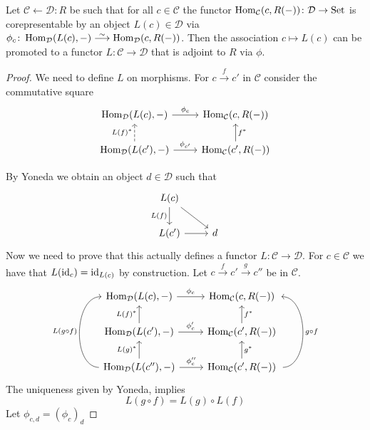 

\begin{prop}
    Let $\mathcal{C} \xleftarrow{}\mathcal{D}:R$ be such that for all $c \in \mathcal{C}$ the functor $\operatorname{Hom}_{\mathcal{C}}(c,R(-))\colon \mathcal{D} \to \operatorname{Set}$ is corepresentable by an object $L(c) \in \mathcal{D}$ via $\phi_c \colon \Hom_{\mathcal{D}}(L(c),-) \isomorphism \Hom_{\mathcal{D}}(c,R(-))$.
    Then the association $c \mapsto L(c)$ can be promoted to a functor $L \colon \mathcal{C} \to \mathcal{D}$ that is adjoint to $R$ via $\phi$.
\end{prop}

\begin{proof}
    We need to define $L$ on morphisms.
    For $c \xrightarrow{f}c'$ in $\mathcal{C}$ consider the commutative square
    \[
    \begin{tikzcd}
        \Hom_{\mathcal{D}}(L(c),-)
        \arrow[r, "\phi_c"]
        &
        \Hom_{\mathcal{C}}(c,R(-))
        \\
        \Hom_{\mathcal{D}}(L(c'),-)
        \arrow[u, dashed, "L(f)^*"]
        \arrow[r, "\phi_{c'}"]
        &
        \Hom_{\mathcal{C}}(c',R(-))
        \arrow[u, "f^*"']
    \end{tikzcd}
    \]

    By Yoneda we obtain an object $d \in\mathcal{D}$ such that
    \[
    \begin{tikzcd}
        L(c)
        \arrow[d, "L(f)"']
        \arrow[rd]
        &
        \\
        L(c')
        \arrow[r]
        &
        d
    \end{tikzcd}
    \]
    Now we need to prove that this actually defines a functor $L\colon \mathcal{C} \to \mathcal{D}$.
    For $c \in \mathcal{C}$ we have that $L(\operatorname{id}_c)=\operatorname{id}_{L(c)}$ by construction.
    Let $c \xrightarrow{f}c' \xrightarrow{g}c''$ be in $\mathcal{C}$.
    \[
    \begin{tikzcd}
        \Hom_{\mathcal{D}}(L(c),-)
        \arrow[r, "\phi_c"]
        &
        \Hom_{\mathcal{C}}(c, R(-))
        \\
        \Hom_{\mathcal{D}}(L(c'),-)
        \arrow[r, "\phi_c'"]
        \arrow[u, "L(f)^*"]
        &
        \Hom_{\mathcal{C}}(c', R(-))
        \arrow[u, "f^*"']
        \\        
        \Hom_{\mathcal{D}}(L(c''),-)
        \arrow[r, "\phi_c''"]
        \arrow[u, "L(g)^*"]
        \arrow[uu, bend left=90, "L(g \circ f)"]
        &
        \Hom_{\mathcal{C}}(c', R(-))
        \arrow[u, "g^*"']
        \arrow[uu,bend right=90,  shift right ,"g \circ f"']
    \end{tikzcd}
    \]
    The uniqueness given by Yoneda, implies
    \[
    L(g \circ f) = L(g) \circ L(f)
    \]
    Let $\phi_{c,d}=(\phi_c)_d$
\end{proof}